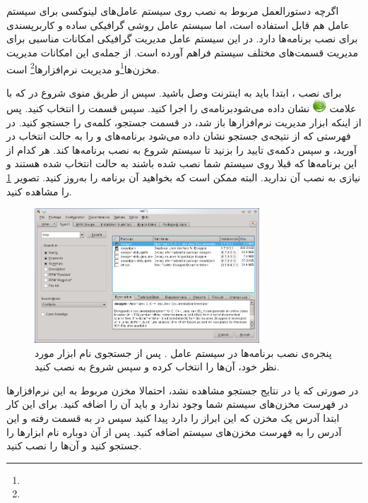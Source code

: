 \section{}

اگرچه دستورالعمل مربوط به نصب  روی سیستم عامل‌های لینوکسی برای سیستم
عامل  هم قابل استفاده است، اما سیستم عامل  روشی
گرافیکی ساده و کاربرپسندی برای نصب برنامه‌ها دارد.
در این سیستم عامل مدیریت گرافیکی  امکانات مناسبی برای مدیریت قسمت‌های
مختلف سیستم فراهم آورده است.
از جمله‌ی این امکانات مدیریت مخزن‌ها\footnote{}و مدیریت
نرم‌افزارها\footnote{} است.

برای نصب ، ابتدا باید به اینترنت وصل باشید. سپس از طریق منوی شروع در
 که با علامت \includegraphics[width=0.5cm]{image/opensuse} نشان
داده می‌شودبرنامه‌ی  را اجرا کنید. سپس قسمت  را
انتخاب کنید. پس از اینکه ابزار مدیریت نرم‌افزارها باز شد، در قسمت جستجو، کلمه‌ی
 را جستجو کنید. در فهرستی که از نتیجه‌ی جستجو نشان داده می‌شود
برنامه‌های  و  را به حالت انتخاب در آورید، و سپس
دکمه‌ی تایید را بزنید تا سیستم شروع به نصب برنامه‌ها کند. هر کدام از این
برنامه‌ها که قبلا روی سیستم شما نصب شده باشند به حالت انتخاب شده هستند و نیازی
به نصب آن ندارید. البته ممکن است که بخواهید آن برنامه را به‌روز کنید. تصویر
\ref{image/install/OpenSUSE/setup} را مشاهده کنید.

\begin{figure}
 \centering
\includegraphics[width=0.75\textwidth]{image/install/OpenSUSE/setup}
\caption[پنجره‌ی نصب برنامه‌ها در سیستم عامل .]{
پنجره‌ی نصب برنامه‌ها در سیستم عامل . پس از جستجوی نام ابزار مورد
نظر خود، آن‌ها را انتخاب کرده و سپس شروع به نصب کنید.
}
\label{image/install/OpenSUSE/setup}
\end{figure}

در صورتی که  یا  در نتایج جستجو مشاهده نشد، احتمالا
مخزن مربوط به این نرم‌افزارها در فهرست مخزن‌های سیستم شما وجود ندارد و باید آن
را اضافه کنید. برای این کار ابتدا آدرس یک مخزن که این ابراز را دارد پیدا کنید
سپس در  به قسمت  رفته و این آدرس را به فهرست
مخزن‌های سیستم اضافه کنید. پس از آن دوباره نام ابزارها را جستجو کنید و آن‌ها را
نصب کنید.

